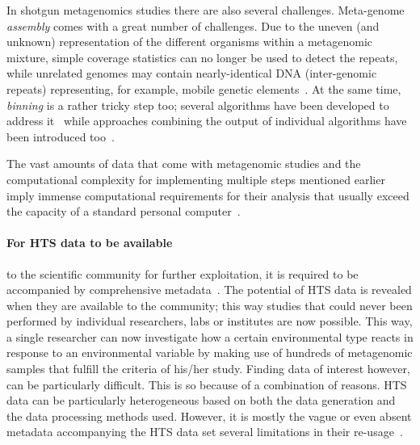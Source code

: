       In shotgun metagenomics studies there are also several challenges. 
      Meta-genome \textit{assembly} comes with a great number of challenges. 
      Due to the uneven (and unknown) representation of the different organisms within a metagenomic mixture, simple coverage statistics can no longer be used to detect the repeats, while unrelated genomes may contain
      nearly-identical DNA (inter-genomic repeats) representing, for example, mobile genetic elements~\cite{ghurye2016focus}.
      At the same time, \textit{binning} is a rather tricky step too; 
      several algorithms have been developed to address it~\cite{yue2020evaluating}
      while approaches combining the output of individual algorithms have been introduced too~\cite{song2017binning_refiner}.


      The vast amounts of data that come with metagenomic studies and the computational complexity for implementing multiple steps mentioned earlier imply immense computational requirements for their analysis that usually exceed the capacity of a standard personal computer~\cite{merelli2014managing}. 

      \paragraph{For HTS data to be available }
      to the scientific community for further exploitation,
      it is required to be accompanied by
      comprehensive metadata~\cite{vangay2021microbiome}. 
      The potential of HTS data is revealed when they are available to the community; 
      this way studies that could never been performed
      by individual researchers, labs or institutes are now possible. 
      This way, 
      a single researcher can now investigate
      how a certain environmental type reacts in response to an environmental 
      variable by making use of hundreds of metagenomic samples 
      that fulfill the criteria of his/her study.
      Finding data of interest however, can be particularly difficult.
      This is so because of a combination of reasons.
      HTS data can be particularly heterogeneous based on both the data generation and the data processing methods used. 
      However, it is mostly the vague or even absent metadata accompanying the HTS data set several limitations in their re-usage~\cite{hu2022challenges}. 


